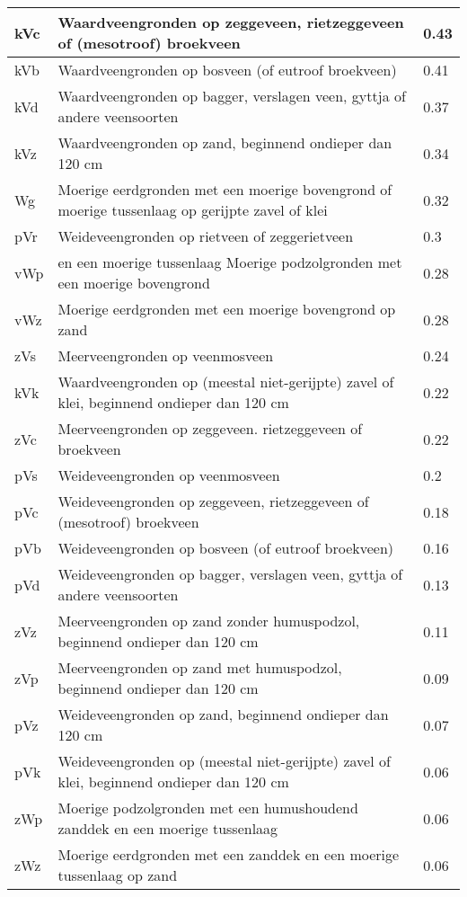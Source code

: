 \documentclass[a4paper,12pt]{scrbook}
\begin{document}
\begin{appendices}
\begin{center}
\begin{longtable}{|l| p{11cm} | l |}
kVc & Waardveengronden op zeggeveen, rietzeggeveen of (mesotroof) broekveen  & 0.43 \\ \hline
kVb & Waardveengronden op bosveen (of eutroof broekveen) & 0.41 \\ \hline
kVd & Waardveengronden op bagger, verslagen veen, gyttja of andere veensoorten  & 0.37 \\ \hline
kVz & Waardveengronden op zand, beginnend ondieper dan 120 cm  & 0.34 \\ \hline
Wg & Moerige eerdgronden met een moerige bovengrond of  moerige tussenlaag op gerijpte zavel of klei  & 0.32 \\ \hline
pVr & Weideveengronden op rietveen of zeggerietveen  & 0.3 \\ \hline
vWp & en een moerige tussenlaag Moerige podzolgronden met een moerige bovengrond  & 0.28 \\ \hline
vWz & Moerige eerdgronden met een moerige bovengrond op zand  & 0.28 \\ \hline
zVs & Meerveengronden op veenmosveen  & 0.24 \\ \hline
kVk & Waardveengronden op (meestal niet-gerijpte) zavel of klei, beginnend ondieper dan 120 cm  & 0.22 \\ \hline
zVc & Meerveengronden op zeggeveen. rietzeggeveen of broekveen  & 0.22 \\ \hline
pVs & Weideveengronden op veenmosveen  & 0.2 \\ \hline
pVc & Weideveengronden op zeggeveen, rietzeggeveen of (mesotroof) broekveen  & 0.18 \\ \hline
pVb & Weideveengronden op bosveen (of eutroof broekveen)  & 0.16 \\ \hline
pVd & Weideveengronden op bagger, verslagen veen, gyttja of andere veensoorten & 0.13 \\ \hline
zVz & Meerveengronden op zand zonder humuspodzol, beginnend ondieper dan 120 cm & 0.11 \\ \hline
zVp & Meerveengronden op zand met humuspodzol, beginnend ondieper dan 120 cm & 0.09 \\ \hline
pVz & Weideveengronden op zand, beginnend ondieper dan 120 cm  & 0.07 \\ \hline
pVk & Weideveengronden op (meestal niet-gerijpte) zavel of klei, beginnend ondieper dan 120 cm  & 0.06 \\ \hline
zWp & Moerige podzolgronden met een humushoudend zanddek en een moerige tussenlaag  & 0.06 \\ \hline
zWz & Moerige eerdgronden met een zanddek en een moerige tussenlaag op zand  & 0.06 \\ \hline

\end{longtable}
\end{center}
\end{appendices}
\end{document}
